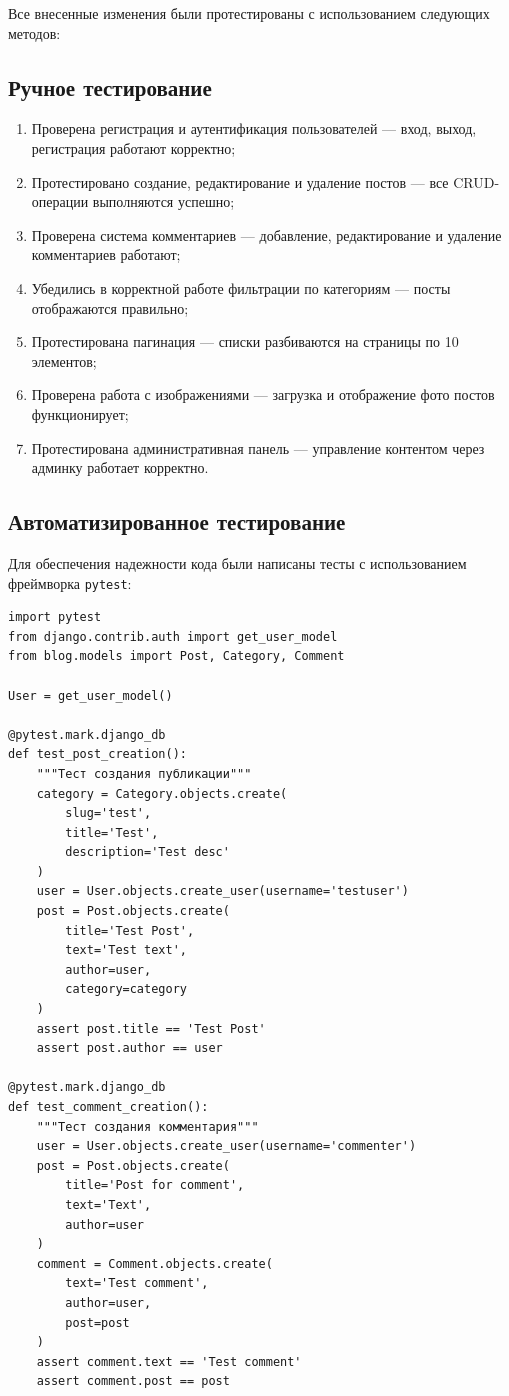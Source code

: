 \documentclass[pract,och,bachelor]{SCWorks}
\begin{document}
Все внесенные изменения были протестированы с использованием следующих методов:

\subsection{Ручное тестирование}

\begin{enumerate}
    \item Проверена регистрация и аутентификация пользователей --- вход, выход, регистрация работают корректно;
    \item Протестировано создание, редактирование и удаление постов --- все CRUD-операции выполняются успешно;
    \item Проверена система комментариев --- добавление, редактирование и удаление комментариев работают;
    \item Убедились в корректной работе фильтрации по категориям --- посты отображаются правильно;
    \item Протестирована пагинация --- списки разбиваются на страницы по 10 элементов;
    \item Проверена работа с изображениями --- загрузка и отображение фото постов функционирует;
    \item Протестирована административная панель --- управление контентом через админку работает корректно.
\end{enumerate}

\subsection{Автоматизированное тестирование}

Для обеспечения надежности кода были написаны тесты с использованием фреймворка \texttt{pytest}:

\begin{listing}[H]
\begin{verbatim}
import pytest
from django.contrib.auth import get_user_model
from blog.models import Post, Category, Comment

User = get_user_model()

@pytest.mark.django_db
def test_post_creation():
    """Тест создания публикации"""
    category = Category.objects.create(
        slug='test',
        title='Test',
        description='Test desc'
    )
    user = User.objects.create_user(username='testuser')
    post = Post.objects.create(
        title='Test Post',
        text='Test text',
        author=user,
        category=category
    )
    assert post.title == 'Test Post'
    assert post.author == user

@pytest.mark.django_db
def test_comment_creation():
    """Тест создания комментария"""
    user = User.objects.create_user(username='commenter')
    post = Post.objects.create(
        title='Post for comment',
        text='Text',
        author=user
    )
    comment = Comment.objects.create(
        text='Test comment',
        author=user,
        post=post
    )
    assert comment.text == 'Test comment'
    assert comment.post == post
\end{verbatim}
\caption{Примеры автоматизированных тестов}
\end{listing}
\end{document}
